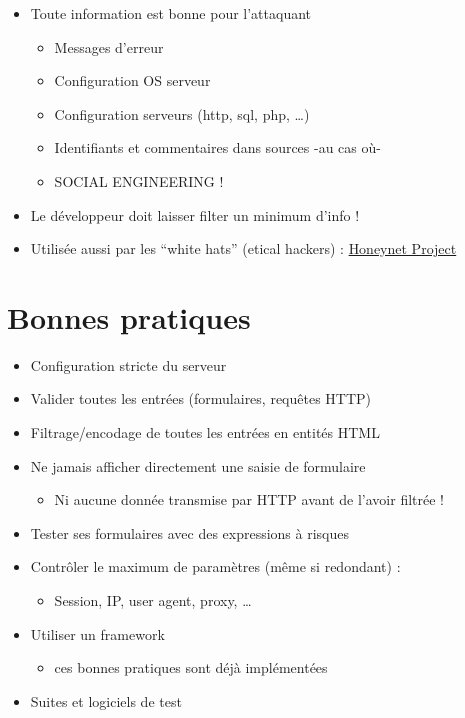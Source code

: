 \begin{itemize}
\tightlist
\item
  Toute information est bonne pour l'attaquant

  \begin{itemize}
  \tightlist
  \item
    Messages d'erreur
  \item
    Configuration OS serveur
  \item
    Configuration serveurs (http, sql, php, \ldots{})
  \item
    Identifiants et commentaires dans sources -au cas où-
  \item
    SOCIAL ENGINEERING !
  \end{itemize}
\item
  Le développeur doit laisser filter un minimum d'info !
\item
  Utilisée aussi par les ``white hats'' (etical hackers) :
  \href{https://www.honeynet.org/node/960}{Honeynet Project}
\end{itemize}

\hypertarget{bonnes-pratiques}{%
\section{Bonnes pratiques}\label{bonnes-pratiques}}

\begin{itemize}
\tightlist
\item
  Configuration stricte du serveur
\item
  Valider toutes les entrées (formulaires, requêtes HTTP)
\item
  Filtrage/encodage de toutes les entrées en entités HTML
\item
  Ne jamais afficher directement une saisie de formulaire

  \begin{itemize}
  \tightlist
  \item
    Ni aucune donnée transmise par HTTP avant de l'avoir filtrée !
  \end{itemize}
\item
  Tester ses formulaires avec des expressions à risques
\item
  Contrôler le maximum de paramètres (même si redondant) :

  \begin{itemize}
  \tightlist
  \item
    Session, IP, user agent, proxy, \ldots{}
  \end{itemize}
\item
  Utiliser un framework

  \begin{itemize}
  \tightlist
  \item
    ces bonnes pratiques sont déjà implémentées
  \end{itemize}
\item
  Suites et logiciels de test
\end{itemize}

